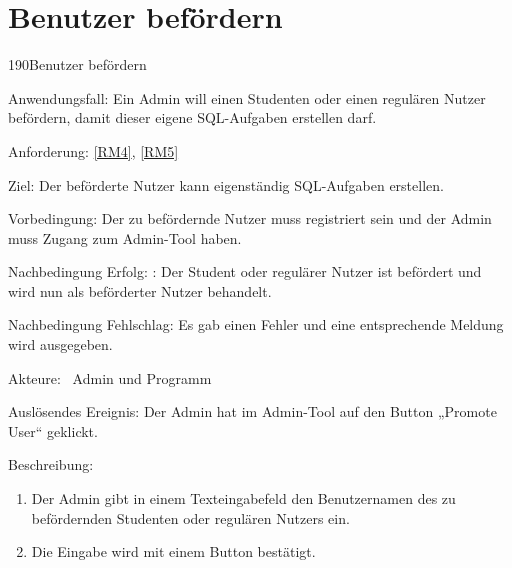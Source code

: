 \section{Benutzer bef\"ordern}
\begin{function}{190}{Benutzer befördern}
\item[Anwendungsfall:] Ein Admin will einen Studenten oder einen regulären Nutzer befördern, damit dieser eigene SQL-Aufgaben erstellen darf.
\item[Anforderung:] \ref{RM4}, \ref{RM5}
\item[Ziel:] Der beförderte Nutzer kann eigenständig SQL-Aufgaben erstellen.
\item[Vorbedingung:] Der zu befördernde Nutzer muss registriert sein und der Admin muss Zugang zum Admin-Tool haben.
\item[Nachbedingung Erfolg:]  : Der Student oder regulärer Nutzer ist befördert und wird nun als beförderter Nutzer behandelt.
\item[Nachbedingung Fehlschlag:] Es gab einen Fehler und eine entsprechende Meldung wird ausgegeben.
\item[Akteure:] ~Admin und Programm
\item[Auslösendes Ereignis:] Der Admin hat im Admin-Tool auf den Button „Promote User“ geklickt.
\item[Beschreibung:] ~
\begin{enumerate}
  \item  Der Admin gibt in einem Texteingabefeld den Benutzernamen des zu befördernden Studenten oder regulären Nutzers ein.
  \item  Die Eingabe wird mit einem Button bestätigt.
\end{enumerate}
\end{function}

